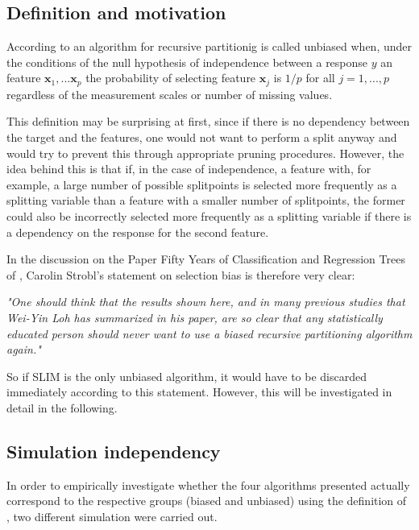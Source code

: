 \subsection{Definition and motivation}

According to \citep{Hothorn.2006} an algorithm for recursive partitionig is called unbiased when, under the conditions of the null hypothesis of independence between a response $y$ an feature $\textbf{x}_{1},...\textbf{x}_{p}$ the probability of selecting feature $\textbf{x}_{j}$ is $1/p$ for all $j = 1,...,p$ regardless of the measurement scales or number of missing values. 

This definition may be surprising at first, since if there is no dependency between the target and the features, one would not want to perform a split anyway and would try to prevent this through appropriate pruning procedures.
However, the idea behind this is that if, in the case of independence, a feature with, for example, a large number of possible splitpoints is selected more frequently as a splitting variable than a feature with a smaller number of splitpoints, the former could also be incorrectly selected more frequently as a splitting variable if there is a dependency on the response for the second feature.
\citep{Loh.2014}

In the discussion on the Paper Fifty Years of Classification and Regression Trees of \citep{Loh.2014}, Carolin Strobl's statement on selection bias is therefore very clear:
\vspace{0.5cm}


{\par\centering \textit{"One should think that the results shown here, and in many previous studies that Wei-Yin Loh has summarized in his paper, are so clear that any statistically educated person should never
want to use a biased recursive partitioning algorithm again."}\par}
\vspace{0.5cm}

So if SLIM is the only unbiased algorithm, it would have to be discarded immediately according to this statement. However, this will be investigated in detail in the following.



\subsection{Simulation independency}
In order to empirically investigate whether the four algorithms presented actually correspond to the respective groups (biased and unbiased) using the definition of \citet{Hothorn.2006}, two different simulation were carried out.

